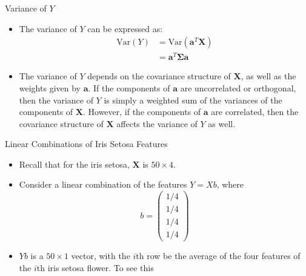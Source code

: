 \documentclass[
  ignorenonframetext,
]{beamer}
\providecommand{\tightlist}{%
  \setlength{\itemsep}{0pt}\setlength{\parskip}{0pt}}
\begin{document}
\begin{frame}{Variance of \(Y\)}
\protect\hypertarget{variance-of-y}{}
\begin{itemize}
\item
  The variance of \(Y\) can be expressed as: \[
  \begin{aligned}
  \text{Var}(Y) &= \text{Var}(\mathbf{a}^T\mathbf{X}) \\
  &= \mathbf{a}^T \boldsymbol{\Sigma} \mathbf{a}
  \end{aligned}
  \]
\item
  The variance of \(Y\) depends on the covariance structure of
  \(\mathbf{X}\), as well as the weights given by \(\mathbf{a}\). If the
  components of \(\mathbf{a}\) are uncorrelated or orthogonal, then the
  variance of \(Y\) is simply a weighted sum of the variances of the
  components of \(\mathbf{X}\). However, if the components of
  \(\mathbf{a}\) are correlated, then the covariance structure of
  \(\mathbf{X}\) affects the variance of \(Y\) as well.
\end{itemize}
\end{frame}

\begin{frame}{Linear Combinations of Iris Setosa Features}
\protect\hypertarget{linear-combinations-of-iris-setosa-features}{}
\begin{itemize}
\tightlist
\item
  Recall that for the iris setosa, \(\mathbf X\) is \(50\times 4\).
\item
  Consider a linear combination of the features \(Y= Xb\), where \[
  b=\begin{pmatrix}
  1/4 \\ 1/4 \\ 1/4 \\ 1/4
  \end{pmatrix}\]
\item
  \(Yb\) is a \(50\times 1\) vector, with the \(i\)th row be the average
  of the four features of the \(i\)th iris setosa flower. To see this
\end{itemize}
\end{frame}
\end{document}
